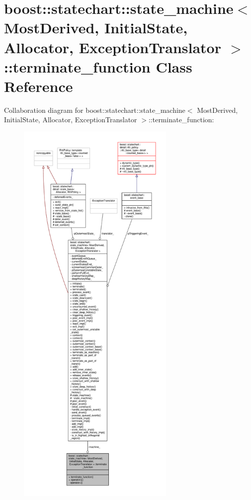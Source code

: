 \hypertarget{classboost_1_1statechart_1_1state__machine_1_1terminate__function}{}\section{boost\+:\+:statechart\+:\+:state\+\_\+machine$<$ Most\+Derived, Initial\+State, Allocator, Exception\+Translator $>$\+:\+:terminate\+\_\+function Class Reference}
\label{classboost_1_1statechart_1_1state__machine_1_1terminate__function}


Collaboration diagram for boost\+:\+:statechart\+:\+:state\+\_\+machine$<$ Most\+Derived, Initial\+State, Allocator, Exception\+Translator $>$\+:\+:terminate\+\_\+function\+:
\nopagebreak
\begin{figure}[H]
\begin{center}
\leavevmode
\includegraphics[height=550pt]{classboost_1_1statechart_1_1state__machine_1_1terminate__function__coll__graph}
\end{center}
\end{figure}
